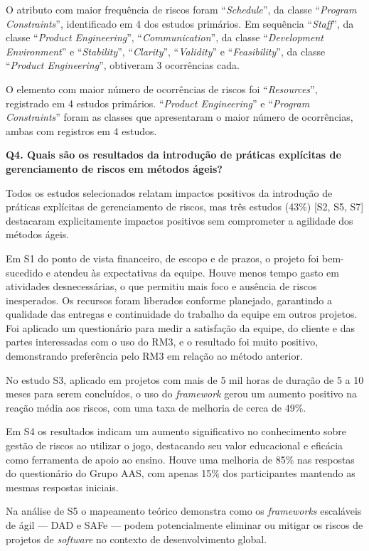 \documentclass[
	12pt,
	openright,
	twoside,
	a4paper,
	english,
	brazil
	]{abntex2}
\begin{document}
O atributo com maior frequência de riscos foram “\textit{Schedule}”, da classe “\textit{Program Constraints}”, identificado em 4 dos estudos primários. Em sequência “\textit{Staff}”, da classe “\textit{Product Engineering}”, “\textit{Communication}”, da classe “\textit{Development Environment}” e “\textit{Stability}”, “\textit{Clarity}”, “\textit{Validity}” e “\textit{Feasibility}”, da classe “\textit{Product Engineering}”, obtiveram 3 ocorrências cada.

O elemento com maior número de ocorrências de riscos foi “\textit{Resources}”, registrado em 4 estudos primários. “\textit{Product Engineering}” e “\textit{Program Constraints}” foram as classes que apresentaram o maior número de ocorrências, ambas com registros em 4 estudos.

\textbf{Q4. Quais são os resultados da introdução de práticas explícitas de gerenciamento de riscos em métodos ágeis?}

Todos os estudos selecionados relatam impactos positivos da introdução de práticas explícitas de gerenciamento de riscos, mas três estudos (43\%) [S2, S5, S7] destacaram explicitamente impactos positivos sem comprometer a agilidade dos métodos ágeis.

Em S1 do ponto de vista financeiro, de escopo e de prazos, o projeto foi bem-sucedido e atendeu às expectativas da equipe. Houve menos tempo gasto em atividades desnecessárias, o que permitiu mais foco e ausência de riscos inesperados. Os recursos foram liberados conforme planejado, garantindo a qualidade das entregas e continuidade do trabalho da equipe em outros projetos. Foi aplicado um questionário para medir a satisfação da equipe, do cliente e das partes interessadas com o uso do RM3, e o resultado foi muito positivo, demonstrando preferência pelo RM3 em relação ao método anterior.

No estudo S3, aplicado em projetos com mais de 5 mil horas de duração de 5 a 10 meses para serem concluídos, o uso do \textit{framework} gerou um aumento positivo na reação média aos riscos, com uma taxa de melhoria de cerca de 49\%.

Em S4 os resultados indicam um aumento significativo no conhecimento sobre gestão de riscos ao utilizar o jogo, destacando seu valor educacional e eficácia como ferramenta de apoio ao ensino. Houve uma melhoria de 85\% nas respostas do questionário do Grupo AAS, com apenas 15\% dos participantes mantendo as mesmas respostas iniciais.

Na análise de S5 o mapeamento teórico demonstra como os \textit{frameworks} escaláveis de ágil — DAD e SAFe — podem potencialmente eliminar ou mitigar os riscos de projetos de \textit{software} no contexto de desenvolvimento global.
\end{document}
